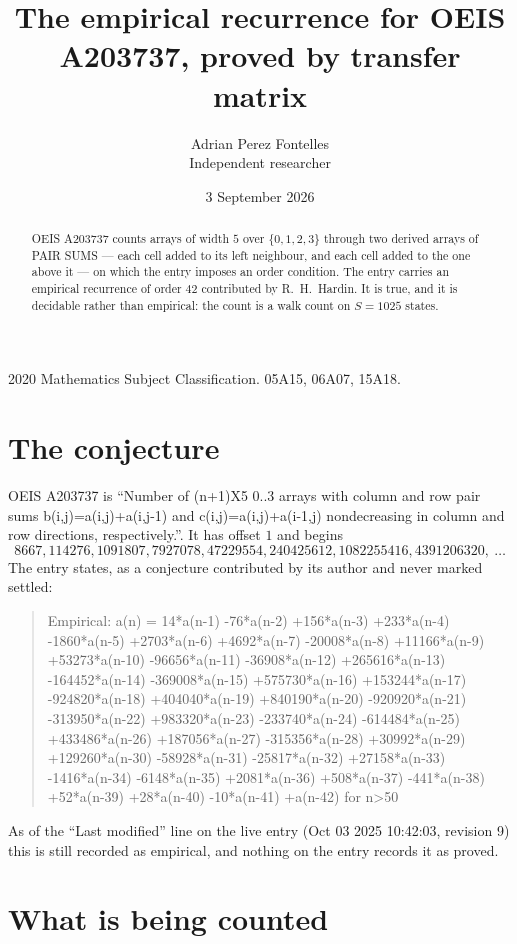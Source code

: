 \documentclass[11pt,a4paper]{article}
\title{The empirical recurrence for OEIS A203737, proved by transfer matrix}
\author{Adrian Perez Fontelles\\ \small Independent researcher}
\date{3 September 2026}
\theoremstyle{plain}
\theoremstyle{definition}
\begin{document}
\maketitle

\begin{abstract}
OEIS A203737 counts arrays of width $5$ over $\{0,1,2,3\}$ through two derived arrays of PAIR SUMS ---
each cell added to its left neighbour, and each cell added to the one above it --- on which the
entry imposes an order condition. The entry carries an empirical recurrence of order $42$
contributed by R.~H.~Hardin. It is true, and it is decidable rather than empirical: the count is
a walk count on $S=1025$ states.
\end{abstract}

\noindent\small 2020 Mathematics Subject Classification. 05A15, 06A07, 15A18.\normalsize

\section{The conjecture}

OEIS A203737 is ``Number of (n+1)X5 0..3 arrays with column and row pair sums b(i,j)=a(i,j)+a(i,j-1) and c(i,j)=a(i,j)+a(i-1,j) nondecreasing in column and row directions, respectively.''. It has offset $1$ and begins
\[
8667, 114276, 1091807, 7927078, 47229554, 240425612, 1082255416, 4391206320,\ \dots
\]
The entry states, as a conjecture contributed by its author and never marked settled:
\begin{quote}
Empirical: a(n) = 14*a(n-1) -76*a(n-2) +156*a(n-3) +233*a(n-4) -1860*a(n-5) +2703*a(n-6) +4692*a(n-7) -20008*a(n-8) +11166*a(n-9) +53273*a(n-10) -96656*a(n-11) -36908*a(n-12) +265616*a(n-13) -164452*a(n-14) -369008*a(n-15) +575730*a(n-16) +153244*a(n-17) -924820*a(n-18) +404040*a(n-19) +840190*a(n-20) -920920*a(n-21) -313950*a(n-22) +983320*a(n-23) -233740*a(n-24) -614484*a(n-25) +433486*a(n-26) +187056*a(n-27) -315356*a(n-28) +30992*a(n-29) +129260*a(n-30) -58928*a(n-31) -25817*a(n-32) +27158*a(n-33) -1416*a(n-34) -6148*a(n-35) +2081*a(n-36) +508*a(n-37) -441*a(n-38) +52*a(n-39) +28*a(n-40) -10*a(n-41) +a(n-42) for n>50
\end{quote}
As of the ``Last modified'' line on the live entry (Oct 03 2025 10:42:03, revision 9) this is still
recorded as empirical, and nothing on the entry records it as proved.

\section{What is being counted}
\end{document}
